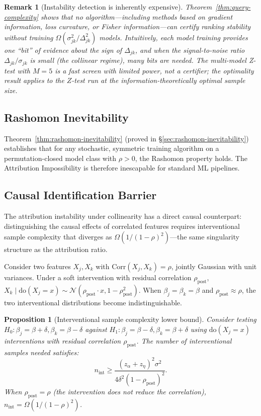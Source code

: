 \documentclass{article}
\newtheorem{proposition}[theorem]{Proposition}
\newtheorem{remark}[theorem]{Remark}
\begin{document}
\begin{remark}[Instability detection is inherently expensive]
Theorem~\ref{thm:query-complexity} shows that no algorithm---including
methods based on gradient information, loss curvature, or Fisher
information---can certify ranking stability without training
$\Omega(\sigma_{jk}^2/\Delta_{jk}^2)$ models.
Intuitively, each model training provides one ``bit'' of evidence about
the sign of $\Delta_{jk}$, and when the signal-to-noise ratio
$\Delta_{jk}/\sigma_{jk}$ is small (the collinear regime), many bits are
needed.
The multi-model Z-test with $M{=}5$ is a fast \emph{screen} with limited
power, not a certifier; the optimality result applies to the $Z$-test
run at the information-theoretically optimal sample size.
\end{remark}

\subsection{Rashomon Inevitability}
\label{sec:inevitability}

Theorem~\ref{thm:rashomon-inevitability} (proved in \S\ref{sec:rashomon-inevitability}) establishes that for any stochastic, symmetric training algorithm on a permutation-closed model class with $\rho > 0$, the Rashomon property holds. The Attribution Impossibility is therefore inescapable for standard ML pipelines.

\subsection{Causal Identification Barrier}
\label{sec:causal-barrier}

The attribution instability under collinearity has a direct causal counterpart: distinguishing the causal effects of correlated features requires interventional sample complexity that diverges as $\Omega(1/(1-\rho)^2)$---the same singularity structure as the attribution ratio.

Consider two features $X_j, X_k$ with $\text{Corr}(X_j, X_k) = \rho$, jointly Gaussian with unit variances. Under a soft intervention with residual correlation $\rho_{\text{post}}$, $X_k \mid \text{do}(X_j = x) \sim \mathcal{N}(\rho_{\text{post}} \cdot x, 1 - \rho_{\text{post}}^2)$. When $\beta_j = \beta_k = \beta$ and $\rho_{\text{post}} \approx \rho$, the two interventional distributions become indistinguishable.

\begin{proposition}[Interventional sample complexity lower bound]
\label{prop:causal-sample-complexity}
Consider testing $H_0: \beta_j = \beta + \delta, \beta_k = \beta - \delta$ against $H_1: \beta_j = \beta - \delta, \beta_k = \beta + \delta$ using $\text{do}(X_j = x)$ interventions with residual correlation $\rho_{\mathrm{post}}$. The number of interventional samples needed satisfies:
\[
    n_{\mathrm{int}} \geq \frac{(z_\alpha + z_\eta)^2 \sigma^2}{4\delta^2 (1 - \rho_{\mathrm{post}})^2}.
\]
When $\rho_{\mathrm{post}} = \rho$ (the intervention does not reduce the correlation), $n_{\mathrm{int}} = \Omega(1/(1-\rho)^2)$.
\end{proposition}
\end{document}
